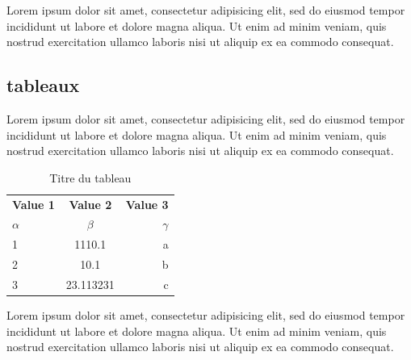 Lorem ipsum dolor sit amet, consectetur adipisicing elit, sed do eiusmod
tempor incididunt ut labore et dolore magna aliqua. Ut enim ad minim veniam,
quis nostrud exercitation ullamco laboris nisi ut aliquip ex ea commodo
consequat.

\subsection{tableaux}   

Lorem ipsum dolor sit amet, consectetur adipisicing elit, sed do eiusmod
tempor incididunt ut labore et dolore magna aliqua. Ut enim ad minim veniam,
quis nostrud exercitation ullamco laboris nisi ut aliquip ex ea commodo
consequat.


\begin{table}[h!]
  \begin{center}
    \caption{Titre du tableau}
    \label{tab:table1}
    \begin{tabular}{l|c|r}
      \textbf{Value 1} & \textbf{Value 2} & \textbf{Value 3}\\
      $\alpha$ & $\beta$ & $\gamma$ \\
      \hline
      1 & 1110.1 & a\\
      2 & 10.1 & b\\
      3 & 23.113231 & c\\
    \end{tabular}
  \end{center}
\end{table}

Lorem ipsum dolor sit amet, consectetur adipisicing elit, sed do eiusmod
tempor incididunt ut labore et dolore magna aliqua. Ut enim ad minim veniam,
quis nostrud exercitation ullamco laboris nisi ut aliquip ex ea commodo
consequat.


